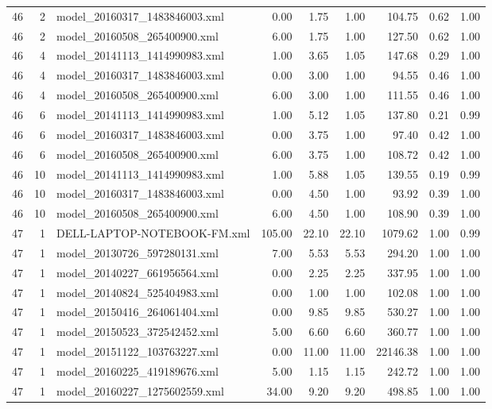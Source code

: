 \begin{table}[ht]
\begin{tabular}{rrlrrrrrr}
   46 &   2 & model\_20160317\_1483846003.xml & 0.00 & 1.75 & 1.00 & 104.75 & 0.62 & 1.00 \\ 
   46 &   2 & model\_20160508\_265400900.xml & 6.00 & 1.75 & 1.00 & 127.50 & 0.62 & 1.00 \\ 
   46 &   4 & model\_20141113\_1414990983.xml & 1.00 & 3.65 & 1.05 & 147.68 & 0.29 & 1.00 \\ 
   46 &   4 & model\_20160317\_1483846003.xml & 0.00 & 3.00 & 1.00 & 94.55 & 0.46 & 1.00 \\ 
   46 &   4 & model\_20160508\_265400900.xml & 6.00 & 3.00 & 1.00 & 111.55 & 0.46 & 1.00 \\ 
   46 &   6 & model\_20141113\_1414990983.xml & 1.00 & 5.12 & 1.05 & 137.80 & 0.21 & 0.99 \\ 
   46 &   6 & model\_20160317\_1483846003.xml & 0.00 & 3.75 & 1.00 & 97.40 & 0.42 & 1.00 \\ 
   46 &   6 & model\_20160508\_265400900.xml & 6.00 & 3.75 & 1.00 & 108.72 & 0.42 & 1.00 \\ 
   46 &  10 & model\_20141113\_1414990983.xml & 1.00 & 5.88 & 1.05 & 139.55 & 0.19 & 0.99 \\ 
   46 &  10 & model\_20160317\_1483846003.xml & 0.00 & 4.50 & 1.00 & 93.92 & 0.39 & 1.00 \\ 
   46 &  10 & model\_20160508\_265400900.xml & 6.00 & 4.50 & 1.00 & 108.90 & 0.39 & 1.00 \\ 
   47 &   1 & DELL-LAPTOP-NOTEBOOK-FM.xml & 105.00 & 22.10 & 22.10 & 1079.62 & 1.00 & 0.99 \\ 
   47 &   1 & model\_20130726\_597280131.xml & 7.00 & 5.53 & 5.53 & 294.20 & 1.00 & 1.00 \\ 
   47 &   1 & model\_20140227\_661956564.xml & 0.00 & 2.25 & 2.25 & 337.95 & 1.00 & 1.00 \\ 
   47 &   1 & model\_20140824\_525404983.xml & 0.00 & 1.00 & 1.00 & 102.08 & 1.00 & 1.00 \\ 
   47 &   1 & model\_20150416\_264061404.xml & 0.00 & 9.85 & 9.85 & 530.27 & 1.00 & 1.00 \\ 
   47 &   1 & model\_20150523\_372542452.xml & 5.00 & 6.60 & 6.60 & 360.77 & 1.00 & 1.00 \\ 
   47 &   1 & model\_20151122\_103763227.xml & 0.00 & 11.00 & 11.00 & 22146.38 & 1.00 & 1.00 \\ 
   47 &   1 & model\_20160225\_419189676.xml & 5.00 & 1.15 & 1.15 & 242.72 & 1.00 & 1.00 \\ 
   47 &   1 & model\_20160227\_1275602559.xml & 34.00 & 9.20 & 9.20 & 498.85 & 1.00 & 1.00 \\ 

\end{tabular}
\end{table}
